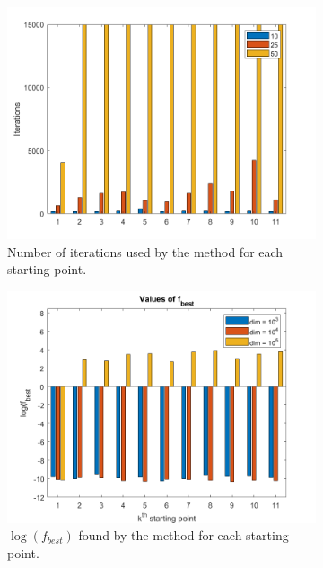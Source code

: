\begin{figure}[H]
    \centering
    \begin{subfigure}{0.45\textwidth}
        \centering
        \includegraphics[width=\textwidth]{img/pb76_SX_iter.png}
        \caption{Number of iterations used by the method for each starting point.}
        \label{fig:iter}
    \end{subfigure}
    \hspace{1cm}
    \begin{subfigure}{0.45\textwidth}
        \centering
        \includegraphics[width=\textwidth]{img/pb76_SX_log(fbest).png}
        \caption{ $\log(f_{best})$ found by the method for each starting point.}
        \label{76log(fbest)}
    \end{subfigure}
    \caption{}
\end{figure}


